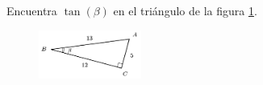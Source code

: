 Encuentra $\tan(\beta)$ en el triángulo de la figura \ref{fig:functrig13}.
\begin{figure}[H]
    \begin{center}
        \includegraphics[width=0.3\textwidth]{../images/functrig13.png}
    \end{center}
    \caption{}
    \label{fig:functrig13}
\end{figure}

